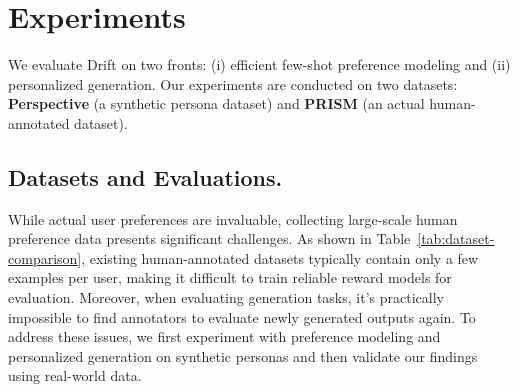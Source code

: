 \section{Experiments}

We evaluate Drift on two fronts: (i) efficient few-shot preference modeling and (ii) personalized generation. Our experiments are conducted on two datasets: \textbf{Perspective} (a synthetic persona dataset) and \textbf{PRISM} (an actual human-annotated dataset).

\begin{table}[ht]
\centering
{}
\caption{Comparison of personal preference datasets. Perspective offers both scale and explicit persona information, enabling comprehensive evaluation.}
\label{tab:dataset-comparison}
\vspace{-5mm}
\end{table}

\subsection{Datasets and Evaluations.}
While actual user preferences are invaluable, collecting large-scale human preference data presents significant challenges. As shown in Table~\ref{tab:dataset-comparison}, existing human-annotated datasets typically contain only a few examples per user, making it difficult to train reliable reward models for evaluation. Moreover, when evaluating generation tasks, it's practically impossible to find annotators to evaluate newly generated outputs again. To address these issues, we first experiment with preference modeling and personalized generation on synthetic personas and then validate our findings using real-world data.

